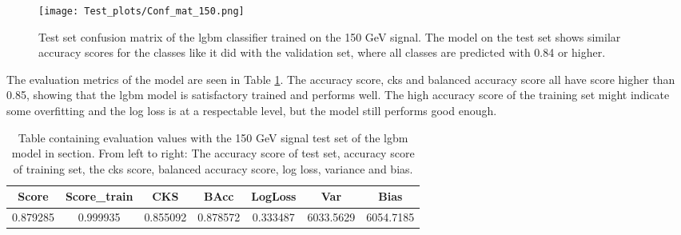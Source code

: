 \documentclass[a4paper, american, 12pt]{report}
\begin{document}
	\begin{figure}[htb!]
		\centering\texttt{[image: Test\_plots/Conf\_mat\_150.png]}
		\caption[Test set confusion matrix for the \acrshort{lgbm} model trained on the 150 GeV signal.]{Test set confusion matrix of the \acrshort{lgbm} classifier trained on the 150 GeV signal. The model on the test set shows similar accuracy scores for the classes like it did with the validation set, where all classes are predicted with 0.84 or higher. \label{fig:ConfTest_150}}
	\end{figure}
	
	The evaluation metrics of the model are seen in Table \ref{tab:Test_150}. The accuracy score, \acrshort{cks} and balanced accuracy score all have score higher than 0.85, showing that the \acrshort{lgbm} model is satisfactory trained and performs well. The high accuracy score of the training set might indicate some overfitting and the log loss is at a respectable level, but the model still performs good enough.
	\begin{table}[htb!]
		\hspace{-0.8cm}
		\begin{tabular}{ |c|c|c|c|c|c|c| }
			\hline \rule{0pt}{13pt}
			Score & Score\_train & CKS & BAcc & LogLoss & Var & Bias \\
			\hline \rule{0pt}{13pt}
			0.879285 & 0.999935 & 0.855092 & 0.878572 &  0.333487 & 6033.5629 & 6054.7185 \\
			\hline
		\end{tabular}	         
		\caption[Evaluation with 150 Gev signal test set.]{Table containing evaluation values with the 150 GeV signal test set of the \acrshort{lgbm} model in section. From left to right: The accuracy score of test set, accuracy score of training set, the \acrshort{cks} score, balanced accuracy score, log loss, variance and bias.}
		\label{tab:Test_150}
	\end{table}
	
\end{document}
